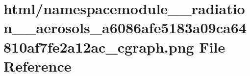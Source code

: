 \hypertarget{namespacemodule____radiation____aerosols__a6086afe5183a09ca64810af7fe2a12ac__cgraph_8png}{}\section{html/namespacemodule\+\_\+\+\_\+radiation\+\_\+\+\_\+aerosols\+\_\+a6086afe5183a09ca64810af7fe2a12ac\+\_\+cgraph.png File Reference}
\label{namespacemodule____radiation____aerosols__a6086afe5183a09ca64810af7fe2a12ac__cgraph_8png}
